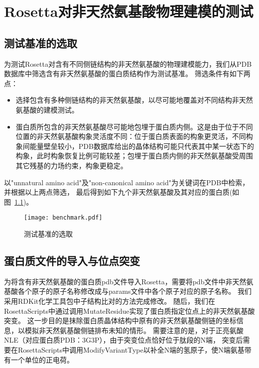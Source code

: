 
\chapter{Rosetta对非天然氨基酸物理建模的测试}



\section{测试基准的选取}

为测试Rosetta对含有不同侧链结构的非天然氨基酸的物理建模能力，我们从PDB数据库中筛选含有非天然氨基酸的蛋白质结构作为测试基准。
筛选条件有如下两点：
\begin{itemize}
  \item 选择包含有多种侧链结构的非天然氨基酸，以尽可能地覆盖对不同结构非天然氨基酸的建模测试。
  \item 蛋白质所包含的非天然氨基酸尽可能地包埋于蛋白质内侧。这是由于位于不同位置的非天然氨基酸构象灵活度不同：位于蛋白质表面的构象更灵活，不同构象间能量壁垒较小，PDB数据库给出的晶体结构可能只代表其中某一状态下的构象，此时构象恢复比例可能较差；包埋于蛋白质内侧的非天然氨基酸受周围其它残基的力场约束，构象更稳定。
\end{itemize}
以"unnatural amino acid"及"non-canonical amino acid"为关键词在PDB中检索，并根据以上两点筛选，
最后得到如下九个非天然氨基酸及其对应的蛋白质(如图~\ref{fig:benchmark})。
\begin{figure}
  \centering
  \texttt{[image: benchmark.pdf]}
  \caption{测试基准的选取}
  \label{fig:benchmark}
\end{figure}



\section{蛋白质文件的导入与位点突变}

为将含有非天然氨基酸的蛋白质pdb文件导入Rosetta，需要将pdb文件中非天然氨基酸各个原子的原子名称修改成与params文件中各个原子对应的原子名称。
我们采用RDKit化学工具包中子结构比对的方法完成修改。
随后，我们在RosettaScripts\cite{RN105}中通过调用MutateResidue实现了蛋白质指定位点上的非天然氨基酸突变。
这一步目的是抹除蛋白质晶体结构中原有的非天然氨基酸侧链的坐标信息，以模拟非天然氨基酸侧链排布未知的情形。
需要注意的是，对于正亮氨酸NLE（对应蛋白质PDB：3G3P），由于突变位点恰好位于肽段的N端，
突变后需要在RosettaScripts中调用ModifyVariantType以补全N端的氢原子，使N端氨基带有一个单位的正电荷。



